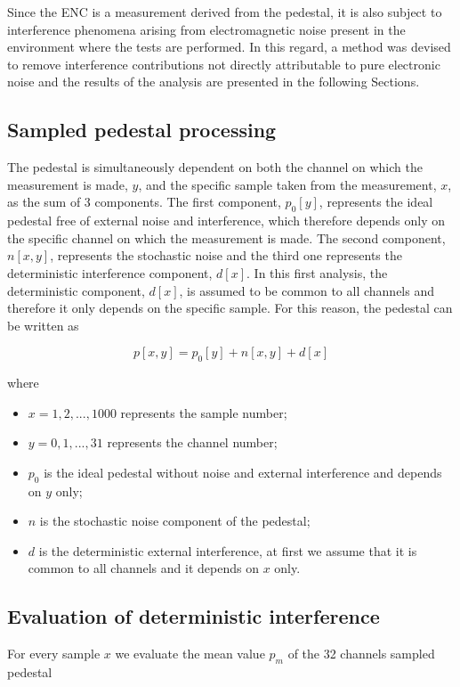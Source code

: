 \par
Since the ENC is a measurement derived from the pedestal, it is also subject to interference phenomena arising from electromagnetic noise present in the environment where the tests are performed. In this regard, a method was devised to remove interference contributions not directly attributable to pure electronic noise and the results of the analysis are presented in the following Sections.

\subsection{Sampled pedestal processing}
The pedestal is simultaneously dependent on both the channel on which the measurement is made, $y$, and the specific sample taken from the measurement, $x$, as the sum of 3 components. The first component, $p_0[y]$, represents the ideal pedestal free of external noise and interference, which therefore depends only on the specific channel on which the measurement is made. The second component, $n[x, y]$, represents the stochastic noise and the third one represents the deterministic interference component, $d[x]$. In this first analysis, the deterministic component, $d[x]$, is assumed to be common to all channels and therefore it only depends on the specific sample. For this reason, the pedestal can be written as

\begin{equation} \label{eq1}
    p[x,y] = p_0[y] + n[x, y] + d[x]
\end{equation}

\noindent
where
\begin{itemize}
    \itemsep0em 
    \item $x=1,2,...,1000$ represents the sample number;
    \item $y=0,1,...,31$ represents the channel number;
    \item $p_0$ is the ideal pedestal without noise and external interference and depends on $y$ only;
    \item $n$ is the stochastic noise component of the pedestal;
    \item $d$ is the deterministic external interference, at first we assume that it is common to all channels and it depends on $x$ only.
\end{itemize}

\subsection{Evaluation of deterministic interference}
For every sample $x$ we evaluate the mean value $p_{m}$ of the 32 channels sampled pedestal

